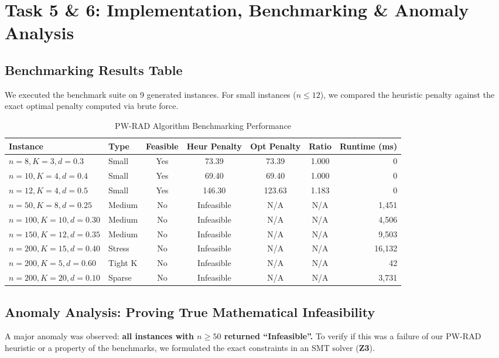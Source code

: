 \documentclass[11pt,a4paper]{article}
\begin{document}
\newpage

\section{Task 5 \& 6: Implementation, Benchmarking \& Anomaly Analysis}

\subsection{Benchmarking Results Table}
We executed the benchmark suite on 9 generated instances. For small instances ($n \le 12$), we compared the heuristic penalty against the exact optimal penalty computed via brute force.

\begin{table}[h]
\centering
\caption{PW-RAD Algorithm Benchmarking Performance}
\vspace{0.2cm}
\begin{tabular}{llccccr}
\toprule
\textbf{Instance} & \textbf{Type} & \textbf{Feasible} & \textbf{Heur Penalty} & \textbf{Opt Penalty} & \textbf{Ratio} & \textbf{Runtime (ms)} \\
\midrule
$n=8, K=3, d=0.3$ & Small & Yes & 73.39 & 73.39 & 1.000 & 0 \\
$n=10, K=4, d=0.4$ & Small & Yes & 69.40 & 69.40 & 1.000 & 0 \\
$n=12, K=4, d=0.5$ & Small & Yes & 146.30 & 123.63 & 1.183 & 0 \\
$n=50, K=8, d=0.25$ & Medium & No & Infeasible & N/A & N/A & 1,451 \\
$n=100, K=10, d=0.30$ & Medium & No & Infeasible & N/A & N/A & 4,506 \\
$n=150, K=12, d=0.35$ & Medium & No & Infeasible & N/A & N/A & 9,503 \\
$n=200, K=15, d=0.40$ & Stress & No & Infeasible & N/A & N/A & 16,132 \\
$n=200, K=5, d=0.60$ & Tight K & No & Infeasible & N/A & N/A & 42 \\
$n=200, K=20, d=0.10$ & Sparse & No & Infeasible & N/A & N/A & 3,731 \\
\bottomrule
\end{tabular}
\end{table}

\subsection{Anomaly Analysis: Proving True Mathematical Infeasibility}
A major anomaly was observed: \textbf{all instances with $n \ge 50$ returned ``Infeasible''.}
To verify if this was a failure of our PW-RAD heuristic or a property of the benchmarks, we formulated the exact constraints in an SMT solver (\textbf{Z3}).
\end{document}
